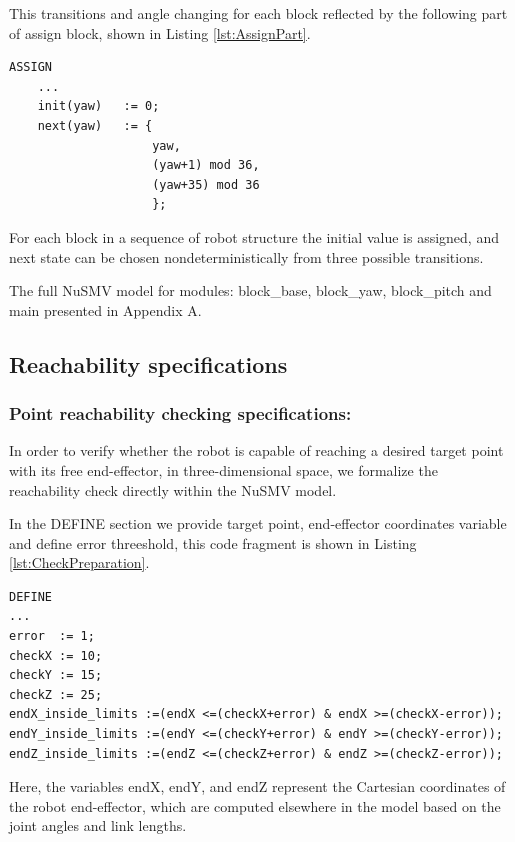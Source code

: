 This transitions and angle changing for each block reflected by the following part  
of assign block, shown in Listing \ref{lst:AssignPart}.

\begin{lstlisting}[language=NuSMV, caption={Assign part of code 
    for block transitions}, label={lst:AssignPart}, float]
ASSIGN
    ...
    init(yaw)   := 0;
    next(yaw)   := { 
                    yaw,                
                    (yaw+1) mod 36,    
                    (yaw+35) mod 36    
                    };
\end{lstlisting}
For each block in a sequence of robot structure the initial value is assigned, and next state 
can be chosen nondeterministically from three possible transitions.

The full NuSMV model for modules: block\_base, block\_yaw, block\_pitch and main presented in Appendix A.

\subsection{Reachability specifications}
\label{ch:reachabilitySpec}
\subsubsection{Point reachability checking specifications:}

In order to verify whether the robot is capable of reaching a desired target point 
with its free end-effector, in three-dimensional space, we formalize the reachability 
check directly within the NuSMV model. 

In the DEFINE section we provide target point, end-effector coordinates variable 
and define error threeshold, this code fragment is shown in Listing \ref{lst:CheckPreparation}.

\begin{lstlisting}[language=NuSMV, 
    caption={End effector and target point coincidence condition}, 
    label={lst:CheckPreparation}]
DEFINE
...
error  := 1;
checkX := 10;
checkY := 15;
checkZ := 25;
endX_inside_limits :=(endX <=(checkX+error) & endX >=(checkX-error));
endY_inside_limits :=(endY <=(checkY+error) & endY >=(checkY-error));
endZ_inside_limits :=(endZ <=(checkZ+error) & endZ >=(checkZ-error));
\end{lstlisting}

Here, the variables endX, endY, and endZ represent the Cartesian coordinates 
of the robot end-effector, which are computed elsewhere in the model 
based on the joint angles and link lengths. 

